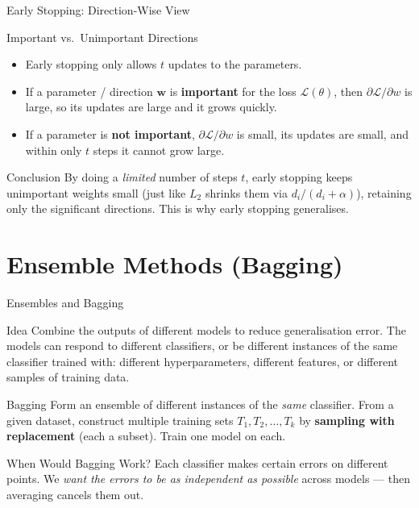 \documentclass{beamer}
\begin{document}
\begin{frame}[shrink=10]{Early Stopping: Direction-Wise View}
  \begin{block}{Important vs.\ Unimportant Directions}
    \begin{itemize}\setlength\itemsep{4pt}
      \item Early stopping only allows $t$ updates to the parameters.
      \item If a parameter / direction $\mathbf{w}$ is \textbf{important}
            for the loss $\mathcal L(\theta)$, then $\partial\mathcal L/\partial w$
            is large, so its updates are large and it grows quickly.
      \item If a parameter is \textbf{not important},
            $\partial\mathcal L/\partial w$ is small, its updates are small,
            and within only $t$ steps it cannot grow large.
    \end{itemize}
  \end{block}

  \begin{exampleblock}{Conclusion}
    By doing a \emph{limited} number of steps $t$, early stopping keeps
    unimportant weights small (just like $L_2$ shrinks them via
    $d_i/(d_i+\alpha)$), retaining only the significant directions. This is
    why early stopping generalises.
  \end{exampleblock}
\end{frame}

\section{Ensemble Methods (Bagging)}

\begin{frame}[shrink=10]{Ensembles and Bagging}
  \begin{block}{Idea}
    Combine the outputs of different models to reduce generalisation error.
    The models can respond to different classifiers, or be different
    instances of the same classifier trained with: different
    hyperparameters, different features, or different samples of training
    data.
  \end{block}

  \begin{block}{Bagging}
    Form an ensemble of different instances of the \emph{same} classifier.
    From a given dataset, construct multiple training sets
    $T_1, T_2, \ldots, T_k$ by \textbf{sampling with replacement} (each a
    subset). Train one model on each.
  \end{block}

  \begin{exampleblock}{When Would Bagging Work?}
    Each classifier makes certain errors on different points. We \emph{want
    the errors to be as independent as possible} across models --- then
    averaging cancels them out.
  \end{exampleblock}
\end{frame}
\end{document}
